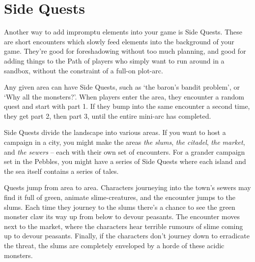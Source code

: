 

\section{Side Quests}\label{sidequests}

Another way to add impromptu elements into your game is Side Quests.  These are short encounters which slowly feed elements into the background of your game.  They're good for foreshadowing without too much planning, and good for adding things to the Path of players who simply want to run around in a sandbox, without the constraint of a full-on plot-arc.  

Any given area can have Side Quests, such as `the baron's bandit problem', or `Why all the monsters?'.  When players enter the area, they encounter a random quest and start with part 1.  If they bump into the same encounter a second time, they get part 2, then part 3, until the entire mini-arc has completed.

Side Quests divide the landscape into various areas.  If you want to host a campaign in a city, you might make the areas \textit{the slums}, \textit{the citadel}, \textit{the market}, and \textit{the sewers} -- each with their own set of encounters.  For a grander campaign set in the Pebbles, you might have a series of Side Quests where each island and the sea itself contains a series of tales.

Quests jump from area to area.  Characters journeying into the town's sewers may find it full of green, animate slime-creatures, and the encounter jumps to the slums.  Each time they journey to the slums there's a chance to see the green monster claw its way up from below to devour peasants.  The encounter moves next to the market, where the characters hear terrible rumours of slime coming up to devour peasants.  Finally, if the characters don't journey down to erradicate the threat, the slums are completely enveloped by a horde of these acidic monsters.


